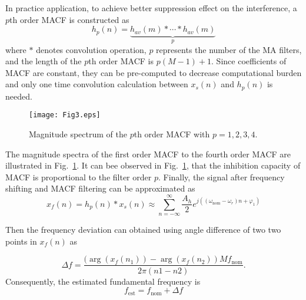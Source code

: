\documentclass[journal,twoside]{IEEEtran}
\begin{document}
In practice application,  to achieve better suppression effect on the interference, a $p$th order MACF is constructed as
\begin{equation}
h_p(n)=\underbrace{h_{av}(m)*\cdots*h_{av}(m)}_{p}
\label{eqn_9}
\end{equation}
where $*$ denotes convolution operation, $p$ represents the number of the MA filters, and the length of the $p$th order MACF is $p(M-1)+1$. Since coefficients of MACF are constant, they can be pre-computed to decrease computational burden and only one time convolution calculation between $x_s(n)$ and $h_p(n)$ is needed. 
\begin{figure}[t]
	\centering
	\texttt{[image: Fig3.eps]}
	\caption{Magnitude spectrum of the $p$th order MACF with $p=1,2,3,4$.}
	\label{fig_1}	
	\vspace*{-15pt}												
\end{figure}

The magnitude spectra of the first order MACF to the fourth order MACF are illustrated in Fig.~\ref{fig_1}. It can bee observed in Fig.~\ref{fig_1},  that the inhibition capacity of MACF is proportional to the filter order $p$.
Finally, the signal after frequency shifting and MACF filtering can be approximated  as
\begin{equation}
x_f(n)=h_p(n)*x_s(n)\approx\sum_{n=-\infty}^{\infty}\dfrac{A_h}{2}e^{j\left((\omega_\mathrm{nom}-\omega_r)n+\varphi_1\right)}\label{eqn_10}
\end{equation}


Then the frequency deviation can obtained using angle difference of two 
two points in $x_f(n)$ as 

\begin{equation}
\Delta f=\dfrac{(\arg(x_f(n_1))-\arg(x_f(n_2))Mf_\mathrm{nom}}{2\pi(n1-n2)}.\label{eqn_12}
\end{equation}
Consequently, the estimated fundamental frequency is
\begin{equation}
f_\mathrm{est}=f_\mathrm{nom}+\Delta f\label{eqn_13}
\end{equation}
\end{document}
